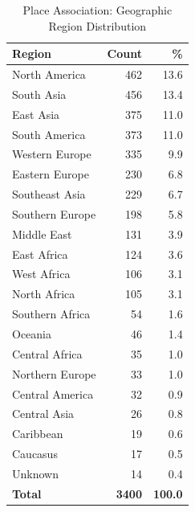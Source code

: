 \begin{table}[htbp]
\centering
\caption{Place Association: Geographic Region Distribution}
\label{tab:place_association_regions}
\begin{tabular}{lrr}
\toprule
\textbf{Region} & \textbf{Count} & \textbf{\%} \\
\midrule
North America & 462 & 13.6 \\
South Asia & 456 & 13.4 \\
East Asia & 375 & 11.0 \\
South America & 373 & 11.0 \\
Western Europe & 335 & 9.9 \\
Eastern Europe & 230 & 6.8 \\
Southeast Asia & 229 & 6.7 \\
Southern Europe & 198 & 5.8 \\
Middle East & 131 & 3.9 \\
East Africa & 124 & 3.6 \\
West Africa & 106 & 3.1 \\
North Africa & 105 & 3.1 \\
Southern Africa & 54 & 1.6 \\
Oceania & 46 & 1.4 \\
Central Africa & 35 & 1.0 \\
Northern Europe & 33 & 1.0 \\
Central America & 32 & 0.9 \\
Central Asia & 26 & 0.8 \\
Caribbean & 19 & 0.6 \\
Caucasus & 17 & 0.5 \\
Unknown & 14 & 0.4 \\
\midrule
\textbf{Total} & \textbf{3400} & \textbf{100.0} \\
\bottomrule
\end{tabular}
\end{table}

